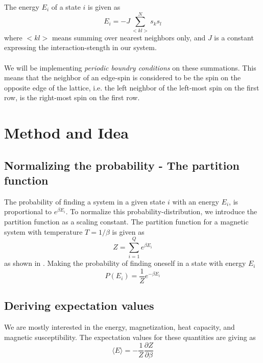 \documentclass[10pt,a4paper]{article}
\begin{document}
The energy $E_i$ of a state $i$ is given as
\begin{equation}
E_i = -J \sum\limits_{<kl>}^N s_k s_l
\end{equation}
where $<kl>$ means summing over nearest neighbors only, and $J$ is a constant expressing the interaction-stength in our system.\\\\
We will be implementing \textit{periodic boundry conditions} on these summations. This means that the neighbor of an edge-spin is considered to be the spin on the opposite edge of the lattice, i.e. the left neighbor of the left-most spin on the first row, is the right-most spin on the first row.





\section{Method and Idea}
\subsection{Normalizing the probability - The partition function}
The probability of finding a system in a given state $i$ with an energy $E_i$, is proportional to $e^{\beta E_i}$. To normalize this probability-distribution, we introduce the partition function as a scaling constant. The partition function for a magnetic system with temperature $T = 1/\beta$ is given as
\begin{equation}\label{eqn:partition}
Z = \sum\limits_{i=1}^Q e^{\beta E_i}
\end{equation}
as shown in \cite{lecture_notes}. Making the probability of finding oneself in a state with energy $E_i$
\begin{equation}
P(E_i) = \frac{1}{Z} e^{-\beta E_i}
\end{equation}

\subsection{Deriving expectation values}
We are mostly interested in the energy, magnetization, heat capacity, and magnetic susceptibility. The expectation values for these quantities are giving as
\begin{equation}\label{eqn:energy}
\langle E \rangle = -\frac{1}{Z}\frac{\partial Z}{\partial\beta}
\end{equation}
\end{document}

